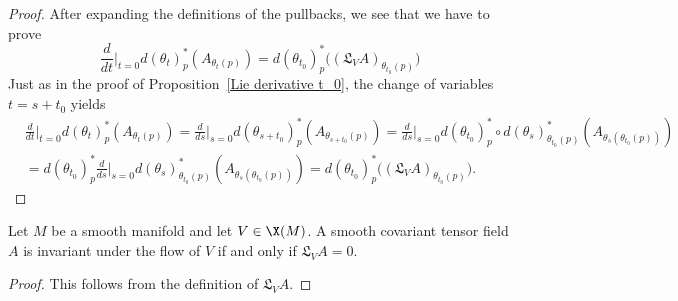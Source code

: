 \begin{proof}
After expanding the definitions of the pullbacks, we see that we have to prove
\[\frac{d}{dt}\Big|_{t=0}d(\theta_t)_p^*(A_{\theta_t(p)})=d(\theta_{t_0})_p^*\big((\mathfrak{L}_VA)_{\theta_{t_0}(p)}\big)\]
Just as in the proof of Proposition~\ref{Lie derivative t_0}, the change of variables $t=s+t_0$ yields
\begin{align*}
&\frac{d}{dt}\Big|_{t=0}d(\theta_t)_p^*(A_{\theta_t(p)})=\frac{d}{ds}\Big|_{s=0}d(\theta_{s+t_0})_p^*(A_{\theta_{s+t_0}(p)})=\frac{d}{ds}\Big|_{s=0}d(\theta_{t_0})_p^*\circ d(\theta_{s})_{\theta_{t_0}(p)}^*(A_{\theta_{s}(\theta_{t_0}(p))})\\
&=d(\theta_{t_0})_p^*\frac{d}{ds}\Big|_{s=0}d(\theta_{s})_{\theta_{t_0}(p)}^*(A_{\theta_{s}(\theta_{t_0}(p))})=d(\theta_{t_0})_p^*\big((\mathfrak{L}_VA)_{\theta_{t_0}(p)}\big).
\end{align*}
\end{proof}
\begin{theorem}\label{tensor filed invariant flow iff}
Let $M$ be a smooth manifold and let $V\in\X(M)$. A smooth covariant tensor field $A$ is invariant under the flow of $V$ if and only if $\mathfrak{L}_VA=0$.
\end{theorem}
\begin{proof}
This follows from the definition of $\mathfrak{L}_VA$.
\end{proof}
